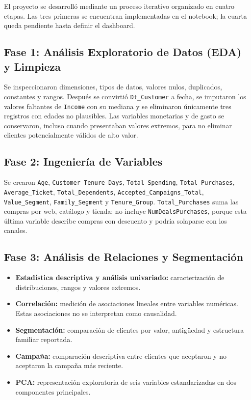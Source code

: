 \documentclass[12pt]{article}
\begin{document}
El proyecto se desarrolló mediante un proceso iterativo organizado en cuatro etapas. Las tres primeras se encuentran implementadas en el notebook; la cuarta queda pendiente hasta definir el dashboard.

\subsection*{Fase 1: Análisis Exploratorio de Datos (EDA) y Limpieza}

Se inspeccionaron dimensiones, tipos de datos, valores nulos, duplicados, constantes y rangos. Después se convirtió \texttt{Dt\_Customer} a fecha, se imputaron los valores faltantes de \texttt{Income} con su mediana y se eliminaron únicamente tres registros con edades no plausibles. Las variables monetarias y de gasto se conservaron, incluso cuando presentaban valores extremos, para no eliminar clientes potencialmente válidos de alto valor.

\subsection*{Fase 2: Ingeniería de Variables}

Se crearon \texttt{Age}, \texttt{Customer\_Tenure\_Days}, \texttt{Total\_Spending}, \texttt{Total\_Purchases}, \texttt{Average\_Ticket}, \texttt{Total\_Dependents}, \texttt{Accepted\_Campaigns\_Total}, \texttt{Value\_Segment}, \texttt{Family\_Segment} y \texttt{Tenure\_Group}. \texttt{Total\_Purchases} suma las compras por web, catálogo y tienda; no incluye \texttt{NumDealsPurchases}, porque esta última variable describe compras con descuento y podría solaparse con los canales.

\subsection*{Fase 3: Análisis de Relaciones y Segmentación}

\begin{itemize}[leftmargin=1.5em, itemsep=0.4em]
    \item \textbf{Estadística descriptiva y análisis univariado:} caracterización de distribuciones, rangos y valores extremos.
    \item \textbf{Correlación:} medición de asociaciones lineales entre variables numéricas. Estas asociaciones no se interpretan como causalidad.
    \item \textbf{Segmentación:} comparación de clientes por valor, antigüedad y estructura familiar reportada.
    \item \textbf{Campaña:} comparación descriptiva entre clientes que aceptaron y no aceptaron la campaña más reciente.
    \item \textbf{PCA:} representación exploratoria de seis variables estandarizadas en dos componentes principales.
\end{itemize}
\end{document}
